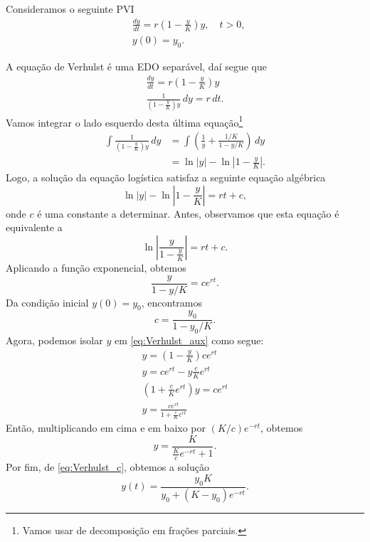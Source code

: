 Consideramos o seguinte PVI
\begin{align}
  &\frac{dy}{dt} = r\left(1 - \frac{y}{K}\right)y,\quad t>0,\\
  &y(0) = y_0.
\end{align}

A equação de Verhulst é uma EDO separável, daí segue que
\begin{gather}
  \frac{dy}{dt} = r\left(1 - \frac{y}{K}\right)y \\
  \frac{1}{\left(1 - \frac{y}{K}\right)y}\,dy = r\,dt.
\end{gather}
Vamos integrar o lado esquerdo desta última equação\footnote{Vamos usar de decomposição em frações parciais.}
\begin{align}
  \int \frac{1}{\left(1 - \frac{y}{K}\right)y}\,dy &= \int \left(\frac{1}{y} + \frac{1/K}{1-y/K}\right)\,dy \\
                                                   &= \ln|y| - \ln\left|1 - \frac{y}{K}\right|.
\end{align}
Logo, a solução da equação logística satisfaz a seguinte equação algébrica
\begin{equation}
  \ln|y| - \ln\left|1 - \frac{y}{K}\right| = rt + c,
\end{equation}
onde $c$ é uma constante a determinar. Antes, observamos que esta equação é equivalente a
\begin{equation}
  \ln\left|\frac{y}{1 - \frac{y}{K}}\right| = rt + c.
\end{equation}
Aplicando a função exponencial, obtemos
\begin{equation}\label{eq:Verhulst_aux}
  \frac{y}{1 - y/K} = ce^{rt}.
\end{equation}
Da condição inicial $y(0) = y_0$, encontramos
\begin{equation}\label{eq:Verhulst_c}
  c = \frac{y_0}{1 - y_0/K}.
\end{equation}
Agora, podemos isolar $y$ em \eqref{eq:Verhulst_aux} como segue: 
\begin{gather}
  y = \left(1-\frac{y}{K}\right)ce^{rt}\\
  y = ce^{rt} - y\frac{c}{K}e^{rt} \\
  \left(1 + \frac{c}{K}e^{rt}\right)y = ce^{rt}\\
  y = \frac{ce^{rt}}{1+\frac{c}{K}e^{rt}}
\end{gather}
Então, multiplicando em cima e em baixo por $(K/c)e^{-rt}$, obtemos
\begin{equation}
  y = \frac{K}{\frac{K}{c}e^{-rt} + 1}.
\end{equation}
Por fim, de \eqref{eq:Verhulst_c}, obtemos a solução
\begin{equation}\label{eq:sol_verhulst}
  y(t) = \frac{y_0K}{y_0 + (K-y_0)e^{-rt}}.
\end{equation}

